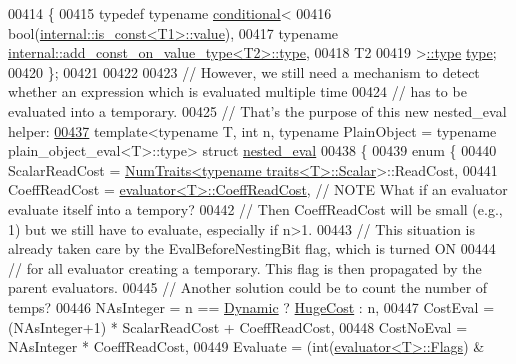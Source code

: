 \begin{DoxyCode}
{00414 \{
00415   \textcolor{keyword}{typedef} \textcolor{keyword}{typename} \hyperlink{struct_eigen_1_1internal_1_1conditional}{conditional}<
00416     bool(\hyperlink{struct_eigen_1_1internal_1_1is__const}{internal::is\_const<T1>::value}),
00417     \textcolor{keyword}{typename} \hyperlink{group___sparse_core___module}{internal::add\_const\_on\_value\_type<T2>::type},
00418     T2
00419   >\hyperlink{class_eigen_1_1internal_1_1_tensor_lazy_evaluator_writable}{::type} \hyperlink{class_eigen_1_1internal_1_1_tensor_lazy_evaluator_writable}{type};
00420 \};
00421 
00422 
00423 \textcolor{comment}{// However, we still need a mechanism to detect whether an expression which is evaluated multiple time}
00424 \textcolor{comment}{// has to be evaluated into a temporary.}
00425 \textcolor{comment}{// That's the purpose of this new nested\_eval helper:}
\hyperlink{struct_eigen_1_1internal_1_1nested__eval}{00437} \textcolor{comment}{}template<typename T, int n, typename PlainObject = typename plain\_object\_eval<T>::type> \textcolor{keyword}{struct }
      \hyperlink{struct_eigen_1_1internal_1_1nested__eval}{nested\_eval}
00438 \{
00439   \textcolor{keyword}{enum} \{
00440     ScalarReadCost = \hyperlink{group___core___module_struct_eigen_1_1_num_traits}{NumTraits<typename traits<T>::Scalar}>::ReadCost,
00441     CoeffReadCost = \hyperlink{struct_eigen_1_1internal_1_1evaluator}{evaluator<T>::CoeffReadCost},  \textcolor{comment}{// NOTE What if an evaluator
       evaluate itself into a tempory?}
00442                                                   \textcolor{comment}{//      Then CoeffReadCost will be small (e.g., 1) but we
       still have to evaluate, especially if n>1.}
00443                                                   \textcolor{comment}{//      This situation is already taken care by the
       EvalBeforeNestingBit flag, which is turned ON}
00444                                                   \textcolor{comment}{//      for all evaluator creating a temporary. This flag
       is then propagated by the parent evaluators.}
00445                                                   \textcolor{comment}{//      Another solution could be to count the number of
       temps?}
00446     NAsInteger = n == \hyperlink{namespace_eigen_ad81fa7195215a0ce30017dfac309f0b2}{Dynamic} ? \hyperlink{namespace_eigen_a3163430a1c13173faffde69016b48aaf}{HugeCost} : n,
00447     CostEval   = (NAsInteger+1) * ScalarReadCost + CoeffReadCost,
00448     CostNoEval = NAsInteger * CoeffReadCost,
00449     Evaluate = (\textcolor{keywordtype}{int}(\hyperlink{struct_eigen_1_1internal_1_1evaluator}{evaluator<T>::Flags}) & 
}
\end{DoxyCode}

